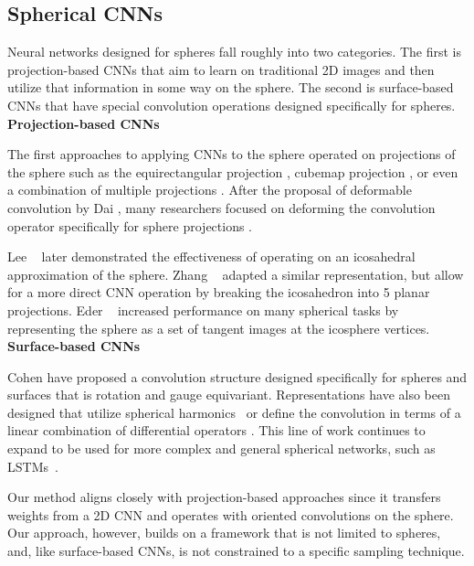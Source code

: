 \documentclass[10pt,twocolumn,letterpaper]{article}
\begin{document}
\subsection{Spherical CNNs} \label{sec:RelatedWork_Spherical}

Neural networks designed for spheres fall roughly into two categories. The first is projection-based CNNs that aim to learn on traditional 2D images and then utilize that information in some way on the sphere. The second is surface-based CNNs that have special convolution operations designed specifically for spheres.\\

\noindent \textbf{Projection-based CNNs}


The first approaches to applying CNNs to the sphere operated on projections of the sphere such as the equirectangular projection \cite{Lai2018}, cubemap projection \cite{Cheng2018,Monroy2018}, or even a combination of multiple projections \cite{Jiang2021,Su2017,Wang2020}. After the proposal of deformable convolution by Dai \etal \cite{Dai2017}, many researchers focused on deforming the convolution operator specifically for sphere projections \cite{Coors2018,Su2019,Tateno2018}. 

Lee \etal~\cite{Lee2019} later demonstrated the effectiveness of operating on an icosahedral approximation of the sphere. Zhang \etal~\cite{Zhang2019} adapted a similar representation, but allow for a more direct CNN operation by breaking the icosahedron into 5 planar projections. Eder \etal~\cite{Eder2020} increased performance on many spherical tasks by representing the sphere as a set of tangent images at the icosphere vertices. \\

\noindent \textbf{Surface-based CNNs}

Cohen \etal \cite{Cohen2019,Cohen2018} have proposed a convolution structure designed specifically for spheres and surfaces that is rotation and gauge equivariant. Representations have also been designed that utilize spherical harmonics~\cite{Esteves2018} or define the convolution in terms of a linear combination of differential operators \cite{Chiyu2019}. This line of work continues to expand to be used for more complex and general spherical networks, such as LSTMs~\cite{Xu2021}.

Our method aligns closely with projection-based approaches since it transfers weights from a 2D CNN and operates with oriented convolutions on the sphere. Our approach, however, builds on a framework that is not limited to spheres, and, like surface-based CNNs, is not constrained to a specific sampling technique.
\end{document}
